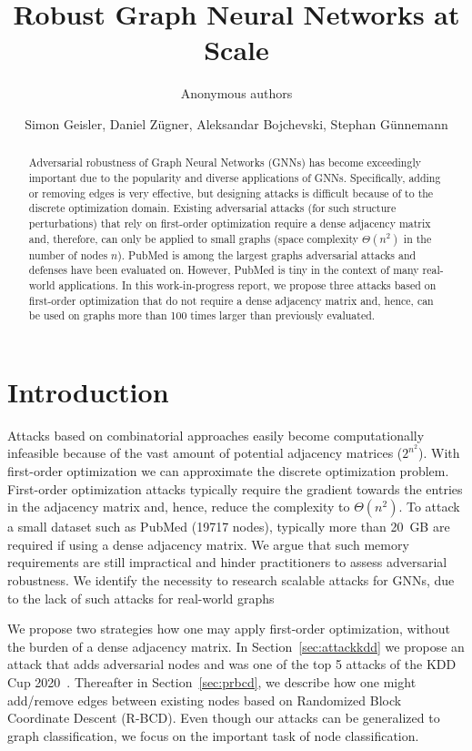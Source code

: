 \documentclass[letterpaper]{article} %
\title{Robust Graph Neural Networks at Scale}
\author {
    Anonymous authors\\
}
\author {
        Simon Geisler,
        Daniel Z\"ugner,
        Aleksandar Bojchevski,
        Stephan G\"unnemann \\
    }
\begin{document}
\maketitle

\begin{abstract}
Adversarial robustness of Graph Neural Networks (GNNs) has become exceedingly important due to the popularity and diverse applications of GNNs. Specifically, adding or removing edges is very effective, but designing attacks is difficult because of to the discrete optimization domain. Existing adversarial attacks (for such structure perturbations) that rely on first-order optimization require a dense adjacency matrix and, therefore, can only be applied to small graphs (space complexity \(\Theta(n^2)\) in the number of nodes \(n\)). PubMed is among the largest graphs adversarial attacks and defenses have been evaluated on. However, PubMed is tiny in the context of many real-world applications. In this work-in-progress report, we propose three attacks based on first-order optimization that do not require a dense adjacency matrix and, hence, can be used on graphs more than 100 times larger than previously evaluated.
\end{abstract}

\noindent \section{Introduction} %

Attacks based on combinatorial approaches easily become computationally infeasible because of the vast amount of potential adjacency matrices (\(2^{n^2}\)). With first-order optimization we can approximate the discrete optimization problem. First-order optimization attacks typically require the gradient towards the entries in the adjacency matrix and, hence, reduce the complexity to \(\Theta(n^2)\). To attack a small dataset such as PubMed (19717 nodes), typically more than 20~GB are required if using a dense adjacency matrix. We argue that such memory requirements are still impractical and hinder practitioners to assess adversarial robustness. We identify the necessity to research scalable attacks for GNNs, due to the lack of such attacks for real-world graphs

We propose two strategies how one may apply first-order optimization, without the burden of a dense adjacency matrix. In Section~\ref{sec:attackkdd} we propose an attack that adds adversarial nodes and was one of the top 5 attacks of the KDD Cup 2020~\citep{Biendata2020}. Thereafter in Section~\ref{sec:prbcd}, we describe how one might add/remove edges between existing nodes based on Randomized Block Coordinate Descent (R-BCD). Even though our attacks can be generalized to graph classification, we focus on the important task of node classification.
\end{document}

